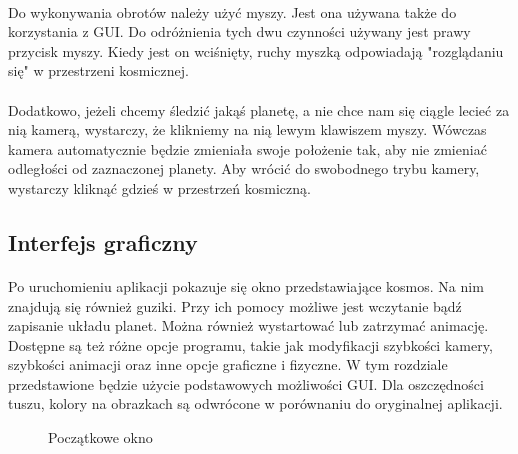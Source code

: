 \paragraph{}
Do wykonywania obrotów należy użyć myszy. Jest ona używana także do korzystania z GUI. Do odróżnienia tych dwu czynności używany jest prawy przycisk myszy. Kiedy jest on wciśnięty, ruchy myszką odpowiadają "rozglądaniu się" w przestrzeni kosmicznej. 
\paragraph{}
Dodatkowo, jeżeli chcemy śledzić jakąś planetę, a nie chce nam się ciągle lecieć za nią kamerą, wystarczy, że klikniemy na nią lewym klawiszem myszy. Wówczas kamera automatycznie będzie zmieniała swoje położenie tak, aby nie zmieniać odległości od zaznaczonej planety. Aby wrócić do swobodnego trybu kamery, wystarczy kliknąć gdzieś w przestrzeń kosmiczną.

\subsection{Interfejs graficzny}\label{sub:interfejs graficzny}
\paragraph{}

Po uruchomieniu aplikacji pokazuje się okno przedstawiające kosmos. Na nim znajdują się również guziki. Przy ich pomocy możliwe jest wczytanie bądź zapisanie układu planet. Można również wystartować lub zatrzymać animację. Dostępne są też różne opcje programu, takie jak modyfikacji szybkości kamery, szybkości animacji oraz inne opcje graficzne i fizyczne. W tym rozdziale przedstawione będzie użycie podstawowych możliwości GUI. Dla oszczędności tuszu, kolory na obrazkach są odwrócone w porównaniu do oryginalnej aplikacji.

\begin{figure}[ht!]
\centering
{}
\caption{Początkowe okno}
\label{fig:inst_00}
\end{figure}

